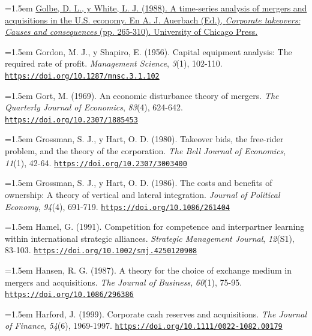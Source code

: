 \documentclass[10pt,a4paper]{article}
\begin{document}
\noindent\hangindent=1.5em \href{https://www.nber.org/system/files/chapters/c2059/c2059.pdf}{Golbe, D. L., y White, L. J. (1988). A time-series analysis of mergers and acquisitions in the U.S. economy. En A. J. Auerbach (Ed.), \textit{Corporate takeovers: Causes and consequences} (pp. 265-310). University of Chicago Press.}

\noindent\hangindent=1.5em Gordon, M. J., y Shapiro, E. (1956). Capital equipment analysis: The required rate of profit. \textit{Management Science}, \textit{3}(1), 102-110. \href{https://doi.org/10.1287/mnsc.3.1.102}{\nolinkurl{https://doi.org/10.1287/mnsc.3.1.102}}

\noindent\hangindent=1.5em Gort, M. (1969). An economic disturbance theory of mergers. \textit{The Quarterly Journal of Economics}, \textit{83}(4), 624-642. \href{https://doi.org/10.2307/1885453}{\nolinkurl{https://doi.org/10.2307/1885453}}

\noindent\hangindent=1.5em Grossman, S. J., y Hart, O. D. (1980). Takeover bids, the free-rider problem, and the theory of the corporation. \textit{The Bell Journal of Economics}, \textit{11}(1), 42-64. \href{https://doi.org/10.2307/3003400}{\nolinkurl{https://doi.org/10.2307/3003400}}

\noindent\hangindent=1.5em Grossman, S. J., y Hart, O. D. (1986). The costs and benefits of ownership: A theory of vertical and lateral integration. \textit{Journal of Political Economy}, \textit{94}(4), 691-719. \href{https://doi.org/10.1086/261404}{\nolinkurl{https://doi.org/10.1086/261404}}

\noindent\hangindent=1.5em Hamel, G. (1991). Competition for competence and interpartner learning within international strategic alliances. \textit{Strategic Management Journal}, \textit{12}(S1), 83-103. \href{https://doi.org/10.1002/smj.4250120908}{\nolinkurl{https://doi.org/10.1002/smj.4250120908}}

\noindent\hangindent=1.5em Hansen, R. G. (1987). A theory for the choice of exchange medium in mergers and acquisitions. \textit{The Journal of Business}, \textit{60}(1), 75-95. \href{https://doi.org/10.1086/296386}{\nolinkurl{https://doi.org/10.1086/296386}}

\noindent\hangindent=1.5em Harford, J. (1999). Corporate cash reserves and acquisitions. \textit{The Journal of Finance}, \textit{54}(6), 1969-1997. \href{https://doi.org/10.1111/0022-1082.00179}{\nolinkurl{https://doi.org/10.1111/0022-1082.00179}}
\end{document}
